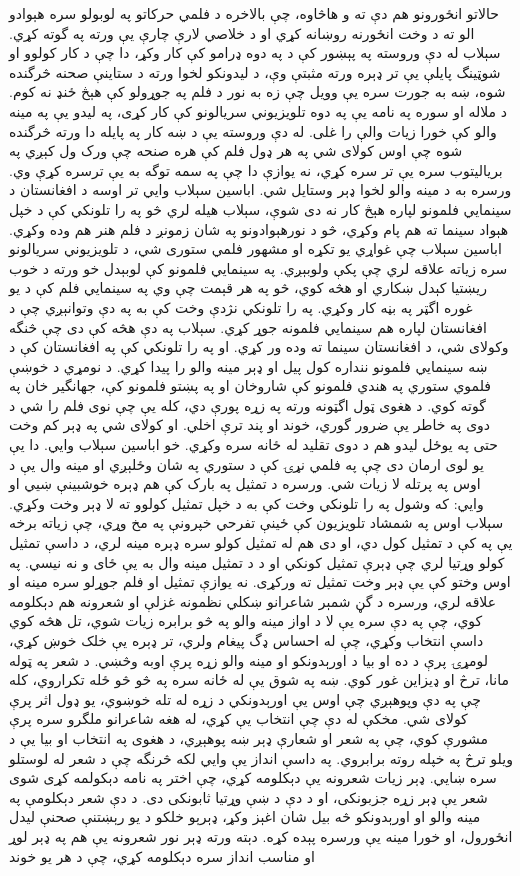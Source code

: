 \documentclass[a4paper]{article}
\begin{document}
حالاتو انځورونو هم دې ته و هاڅاوه، چې بالاخره د فلمي حرکاتو په لوبولو سره هېوادو الو ته د وخت انځورنه روښانه کړي او د خلاصي لارې چارې یې ورته په گوته کړي. سېلاب له دې وروسته په پېښور کې د په دوه ډرامو کې کار وکړ، دا چې د کار کولوو او شوټینگ پایلې یې تر ډېره ورته مثبتې وې، د لیدونکو لخوا ورته د ستاینې صحنه څرگنده شوه، ښه به جورت سره یې وویل چې زه به نور د فلم په جوړولو کې هېڅ ځنډ نه کوم. د ملاله او سوره په نامه یې په دوه تلویزیوني سریالونو کې کار کړی، په لیدو یې په مینه والو کې خورا زیات والې را غلی. له دې وروسته یې د ښه کار په پایله دا ورته څرگنده شوه چې اوس کولای شي په هر ډول فلم کې هره صنحه چې ورک ول کېږي په بریالیتوب سره یې تر سره کړي، نه یوازې دا چې په سمه توگه به یې ترسره کړې وي. ورسره به د مینه والو لخوا ډېر وستایل شي. اباسین سېلاب وايي تر اوسه د افغانستان د سینمایي فلمونو لپاره هېڅ کار نه دی شوې، سېلاب هیله لري څو په را تلونکي کې د خپل هېواد سینما ته هم پام وکړي، څو د نورهېوادونو په شان زمونږ د فلم هنر هم وده وکړي. اباسین سېلاب چې غواړي یو تکړه او مشهور فلمي ستوری شي، د تلویزیوني سریالونو سره زیاته علاقه لري چې پکې ولوبېږي. په سینمايي فلمونو کې لوبېدل خو ورته د خوب ریښتیا کېدل ښکاري او هڅه کوي، څو په هر قېمت چې وي په سینمايي فلم کې د یو غوره اگټر په بڼه کار وکړي. په را تلونکي نژدې وخت کې به په دې وتوانېږي چې د افغانستان لپاره هم سینمايي فلمونه جوړ کړي. سېلاب په دې هڅه کې دی چې څنگه وکولای شي، د افغانستان سینما ته وده ور کړي. او په را تلونکي کې په افغانستان کې د ښه سینمايي فلمونو ننداره کول پیل او ډېر مینه والو را پیدا کړي. د نومړي د خوښې فلموي ستوري په هندي فلمونو کې شاروخان او په پښتو فلمونو کې، جهانگیر خان په گوته کوي. د هغوی ټول اگټونه ورته په زړه پورې دي، کله یې چې نوی فلم را شي د دوی په خاطر یې ضرور گوري، خوند او پند ترې اخلي. او کولای شي په ډېر کم وخت حتی په یوځل لیدو هم د دوی تقلید له ځانه سره وکړي. خو اباسین سېلاب وايي. دا یې یو لوی ارمان دی چې په فلمي نړۍ کې د ستوري په شان وځلېږي او مینه وال یې د اوس په پرتله لا زیات شي. ورسره د تمثیل په بارک کې هم ډېره خوشبینې ښيي او وايي: که وشول په را تلونکي وخت کې به د خپل تمثیل کولوو ته لا ډېر وخت وکړي. سېلاب اوس په شمشاد تلویزیون کې ځینې تفرحي خپرونې په مخ وړي، چې زیاته برخه یې په کې د تمثیل کول دي، او دی هم له تمثیل کولو سره ډېره مینه لري، د داسې تمثیل کولو وړتیا لري چې ډېرې تمثیل کونکي او د د تمثیل مینه وال به یې ځای و نه نیسي. په اوس وختو کې یې ډېر وخت تمثیل ته ورکړی. نه یوازې تمثیل او فلم جوړلو سره مینه او علاقه لري، ورسره د گڼ شمېر شاعرانو ښکلي نظمونه غزلې او شعرونه هم دېکلومه کوي، چې په دې سره یې لا د اواز مینه والو په څو برابره زیات شوي، تل هڅه کوي داسې انتخاب وکړي، چې له احساس ډگ پیغام ولري، تر ډېره یې خلک خوښ کړي، لومړۍ پرې د ده او بیا د اورېدونکو او مینه والو زړه پرې اوبه وڅښي. د شعر په ټوله مانا، ترڅ او ډیزاین غور کوي. ښه په شوق یې له ځانه سره په څو څو ځله تکراروي، کله چې په دې وپوهېږي چې اوس یې اورېدونکي د زړه له تله خوښوي، یو ډول اثر پرې کولای شي. مخکې له دې چې انتخاب یې کړي، له هغه شاعرانو ملگرو سره پرې مشورې کوي، چې په شعر او شعارې ډېر ښه پوهېږي، د هغوی په انتخاب او بیا یې د ویلو ترڅ په خپله روته برابروي. په داسې انداز یې وایي لکه څرنگه چې د شعر له لوستلو سره ښايي. ډېر زیات شعرونه یې دېکلومه کړي، چې اختر په نامه دېکولمه کړی شوی شعر یې ډېر زړه جزبونکی، او د دې د ښې وړتیا ثابونکی دی. د دې شعر دېکلومې په مینه والو او اورېدونکو څه بیل شان اغېز وکړ، ډېرېو خلکو د یو رېښتنې صحنې لیدل انځورول، او خورا مینه یې ورسره پېده کړه. دېته ورته ډېر نور شعرونه یې هم په ډېر لوړ او مناسب انداز سره دېکلومه کړي، چې د هر یو خوند 
\end{document}
